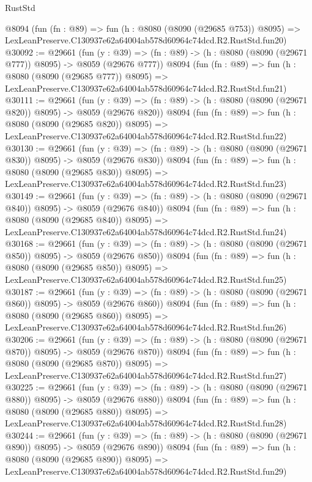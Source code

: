 \begin{lexlean}{RustStd}
\begin{coremodule}
    @8094
    (fun (fn : @89) =>
    fun (h : @8080 (@8090 (@29685 @753)) @8095) =>
    LexLeanPreserve.C130937e62a64004ab578d60964c74dcd.R2.RustStd.fun20)
@30092 := @29661
    (fun (y : @39) => (fn : @89) -> (h : @8080 (@8090 (@29671 @777)) @8095) -> @8059 (@29676 @777))
    @8094
    (fun (fn : @89) =>
    fun (h : @8080 (@8090 (@29685 @777)) @8095) =>
    LexLeanPreserve.C130937e62a64004ab578d60964c74dcd.R2.RustStd.fun21)
@30111 := @29661
    (fun (y : @39) => (fn : @89) -> (h : @8080 (@8090 (@29671 @820)) @8095) -> @8059 (@29676 @820))
    @8094
    (fun (fn : @89) =>
    fun (h : @8080 (@8090 (@29685 @820)) @8095) =>
    LexLeanPreserve.C130937e62a64004ab578d60964c74dcd.R2.RustStd.fun22)
@30130 := @29661
    (fun (y : @39) => (fn : @89) -> (h : @8080 (@8090 (@29671 @830)) @8095) -> @8059 (@29676 @830))
    @8094
    (fun (fn : @89) =>
    fun (h : @8080 (@8090 (@29685 @830)) @8095) =>
    LexLeanPreserve.C130937e62a64004ab578d60964c74dcd.R2.RustStd.fun23)
@30149 := @29661
    (fun (y : @39) => (fn : @89) -> (h : @8080 (@8090 (@29671 @840)) @8095) -> @8059 (@29676 @840))
    @8094
    (fun (fn : @89) =>
    fun (h : @8080 (@8090 (@29685 @840)) @8095) =>
    LexLeanPreserve.C130937e62a64004ab578d60964c74dcd.R2.RustStd.fun24)
@30168 := @29661
    (fun (y : @39) => (fn : @89) -> (h : @8080 (@8090 (@29671 @850)) @8095) -> @8059 (@29676 @850))
    @8094
    (fun (fn : @89) =>
    fun (h : @8080 (@8090 (@29685 @850)) @8095) =>
    LexLeanPreserve.C130937e62a64004ab578d60964c74dcd.R2.RustStd.fun25)
@30187 := @29661
    (fun (y : @39) => (fn : @89) -> (h : @8080 (@8090 (@29671 @860)) @8095) -> @8059 (@29676 @860))
    @8094
    (fun (fn : @89) =>
    fun (h : @8080 (@8090 (@29685 @860)) @8095) =>
    LexLeanPreserve.C130937e62a64004ab578d60964c74dcd.R2.RustStd.fun26)
@30206 := @29661
    (fun (y : @39) => (fn : @89) -> (h : @8080 (@8090 (@29671 @870)) @8095) -> @8059 (@29676 @870))
    @8094
    (fun (fn : @89) =>
    fun (h : @8080 (@8090 (@29685 @870)) @8095) =>
    LexLeanPreserve.C130937e62a64004ab578d60964c74dcd.R2.RustStd.fun27)
@30225 := @29661
    (fun (y : @39) => (fn : @89) -> (h : @8080 (@8090 (@29671 @880)) @8095) -> @8059 (@29676 @880))
    @8094
    (fun (fn : @89) =>
    fun (h : @8080 (@8090 (@29685 @880)) @8095) =>
    LexLeanPreserve.C130937e62a64004ab578d60964c74dcd.R2.RustStd.fun28)
@30244 := @29661
    (fun (y : @39) => (fn : @89) -> (h : @8080 (@8090 (@29671 @890)) @8095) -> @8059 (@29676 @890))
    @8094
    (fun (fn : @89) =>
    fun (h : @8080 (@8090 (@29685 @890)) @8095) =>
    LexLeanPreserve.C130937e62a64004ab578d60964c74dcd.R2.RustStd.fun29)

\end{coremodule}
\end{lexlean}
